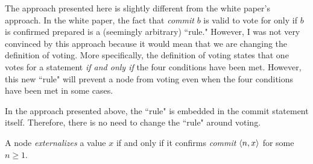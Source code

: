 \begin{rem}
    The approach presented here is slightly different from the white paper's approach.
    In the white paper, the fact that \textit{commit} $b$ is valid to vote for only if $b$ is confirmed prepared is a (seemingly arbitrary) ``rule."
    However, I was not very convinced by this approach because it would mean that we are changing the definition of voting.
    More specifically, the definition of voting states that one votes for a statement \textit{if and only if} the four conditions have been met.  
    However, this new ``rule" will prevent a node from voting even when the four conditions have been met in some cases.

    In the approach presented above, the ``rule" is embedded in the commit statement itself.
    Therefore, there is no need to change the ``rule" around voting.
\end{rem}

\begin{defn}[Externalize]
    A node \textit{externalizes} a value $x$ if and only if it confirms \textit{commit} $\ev{n, x}$ for some $n \geq 1$.
\end{defn}
